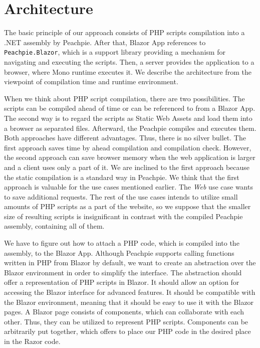 \section{Architecture}

The basic principle of our approach consists of PHP scripts compilation into a .NET assembly by Peachpie.
After that, Blazor App references to \texttt{Peachpie.Bla\-zor}, which is a support library providing a mechanism for navigating and executing the scripts.
Then, a server provides the application to a browser, where Mono runtime executes it.
We describe the architecture from the viewpoint of compilation time and runtime environment.
\par
When we think about PHP script compilation, there are two possibilities.
The scripts can be compiled ahead of time or can be referenced to from a Blazor App. 
The second way is to regard the scripts as Static Web Assets and load them into a browser as separated files.
Afterward, the Peachpie compiles and executes them.
Both approaches have different advantages. 
Thus, there is no silver bullet.
The first approach saves time by ahead compilation and compilation check.
However, the second approach can save browser memory when the web application is larger and a client uses only a part of it.
We are inclined to the first approach because the static compilation is a standard way in Peachpie.
We think that the first approach is valuable for the use cases mentioned earlier.
The \textit{Web} use case wants to save additional requests. 
The rest of the use cases intends to utilize small amounts of PHP scripts as a part of the website, so we suppose that the smaller size of resulting scripts is insignificant in contrast with the compiled Peachpie assembly, containing all of them. 
\par
We have to figure out how to attach a PHP code, which is compiled into the assembly, to the Blazor App.
Although Peachpie supports calling functions written in PHP from Blazor by default, we want to create an abstraction over the Blazor environment in order to simplify the interface.
The abstraction should offer a representation of PHP scripts in Blazor.
It should allow an option for accessing the Blazor interface for advanced features.
It should be compatible with the Blazor environment, meaning that it should be easy to use it with the Blazor pages.
A Blazor page consists of components, which can collaborate with each other.
Thus, they can be utilized to represent PHP scripts.
Components can be arbitrarily put together, which offers to place our PHP code in the desired place in the Razor code.

